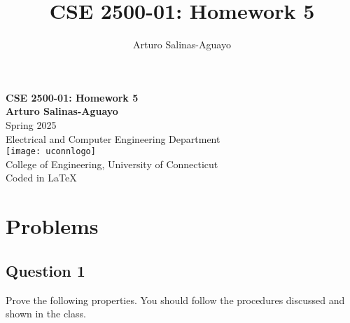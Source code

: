 \documentclass[12pt]{article}
\author{Arturo Salinas-Aguayo}
\title{CSE 2500-01: Homework 5}
\begin{document}
\newcommand{\closure}[2][3]{%
	{}\mkern#1mu\overline{\mkern-#1mu#2}}
\newcommand\ncoverline[1]{\mkern1mu\overline{\mkern-1mu#1\mkern-1mu}\mkern1mu}
\begin{titlepage}
	\centering
	\vspace*{3cm}
	\huge\textbf{CSE 2500-01: Homework 5}\\
	\vspace{5cm}
	\Large\textbf{Arturo Salinas-Aguayo}\\
	\normalsize
	Spring 2025\\
	Electrical and Computer Engineering Department\\
	\vfill
	\texttt{[image: uconnlogo]}\\
	College of Engineering, University of Connecticut\\
	\scriptsize{Coded in \LaTeX}
	\vspace*{1cm}
\end{titlepage}

\section*{Problems}
\subsection*{Question 1}
Prove the following properties. You should follow the procedures discussed and shown in the class.
\end{document}
